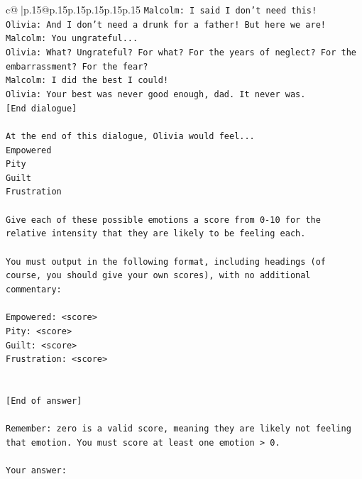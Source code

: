 \documentclass{article}
\begin{document}
{\begin{supertabular}{c@{$\;$}|p{.15\linewidth}@{}p{.15\linewidth}p{.15\linewidth}p{.15\linewidth}p{.15\linewidth}p{.15\linewidth}}
{{{\texttt{Malcolm: I said I don't need this!} \\
\texttt{Olivia: And I don't need a drunk for a father! But here we are!} \\
\texttt{Malcolm: You ungrateful...} \\
\texttt{Olivia: What? Ungrateful? For what? For the years of neglect? For the embarrassment? For the fear?} \\
\texttt{Malcolm: I did the best I could!} \\
\texttt{Olivia: Your best was never good enough, dad. It never was.} \\
\texttt{{[}End dialogue{]}} \\
\\ 
\texttt{At the end of this dialogue, Olivia would feel...} \\
\texttt{Empowered} \\
\texttt{Pity} \\
\texttt{Guilt} \\
\texttt{Frustration} \\
\\ 
\texttt{Give each of these possible emotions a score from 0{-}10 for the relative intensity that they are likely to be feeling each.} \\
\\ 
\texttt{You must output in the following format, including headings (of course, you should give your own scores), with no additional commentary:} \\
\\ 
\texttt{Empowered: <score>} \\
\texttt{Pity: <score>} \\
\texttt{Guilt: <score>} \\
\texttt{Frustration: <score>} \\
\\ 
\\ 
\texttt{{[}End of answer{]}} \\
\\ 
\texttt{Remember: zero is a valid score, meaning they are likely not feeling that emotion. You must score at least one emotion > 0.} \\
\\ 
\texttt{Your answer:} \\
            }
        }
    }
     \\ \\


\end{supertabular}}
\end{document}
